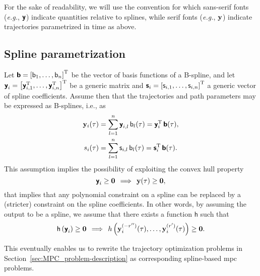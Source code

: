 For the sake of readability, we will use the convention for which sans-serif fonts (\emph{e.g.}, $\boldsymbol{\mathsf{y}}$) indicate quantities relative to splines, while serif fonts (\emph{e.g.}, $\mathbf{y}$) indicate trajectories parametrized in time as above. %



\subsection{Spline parametrization}
\label{ssec:MPC_spline_param}



Let $\boldsymbol{\mathsf{b}} = \left[\mathsf{b}_1, \ldots, \mathsf{b}_n\right]^{\mathrm{T}}$ be the vector of basis functions of a B-spline, and let $\boldsymbol{\mathsf{y}}_i = \left[\boldsymbol{\mathsf{y}}_{i,1}^{\mathrm{T}}, \ldots, \boldsymbol{\mathsf{y}}_{i,n}^{\mathrm{T}}\right]^{\mathrm{T}}$ be a generic matrix and $\boldsymbol{\mathsf{s}}_i = \left[\mathsf{s}_{i,1}, \ldots, \mathsf{s}_{i,n}\right]^{\mathrm{T}}$ a generic vector of spline coefficients. Assume then that the trajectories and path parameters may be expressed as B-splines, i.e., as
%
\begin{align}
    \mathbf{y}_i(\tau) &= \sum_{l=1}^n \boldsymbol{\mathsf{y}}_{i,l}\,\mathsf{b}_l(\tau) = \boldsymbol{\mathsf{y}}_i^{\mathrm{T}}\,\boldsymbol{\mathsf{b}}(\tau), \\
    s_i(\tau) &= \sum_{l=1}^n \mathsf{s}_{i,l}\,\mathsf{b}_l(\tau) = \boldsymbol{\mathsf{s}}_i^{\mathrm{T}}\,\boldsymbol{\mathsf{b}}(\tau).
\end{align}
%
This assumption implies the possibility of exploiting the convex hull property
\begin{equation}
    \boldsymbol{\mathsf{y}}_i \geq \bm{0} \, \implies \, \mathbf{y}(\tau) \geq \bm{0},
\end{equation}
that implies that any polynomial constraint on a spline can be replaced by a (stricter) constraint on the spline coefficients.
In other words, by assuming the output to be a spline, we assume that there exists a function $\mathsf{h}$ such that
\begin{equation}
    \mathsf{h}\left(\boldsymbol{\mathsf{y}}_i\right) \geq \bm{0}
    \, \implies \,
    h\left(\mathbf{y}_i^{(-r'')}(\tau), \ldots, \mathbf{y}^{(r')}_i(\tau)\right) \geq \bm{0}.
\end{equation}

This eventually enables us to rewrite the trajectory optimization problems in Section~\ref{sec:MPC_problem-description} as corresponding spline-based \gls{mpc} problems. %

